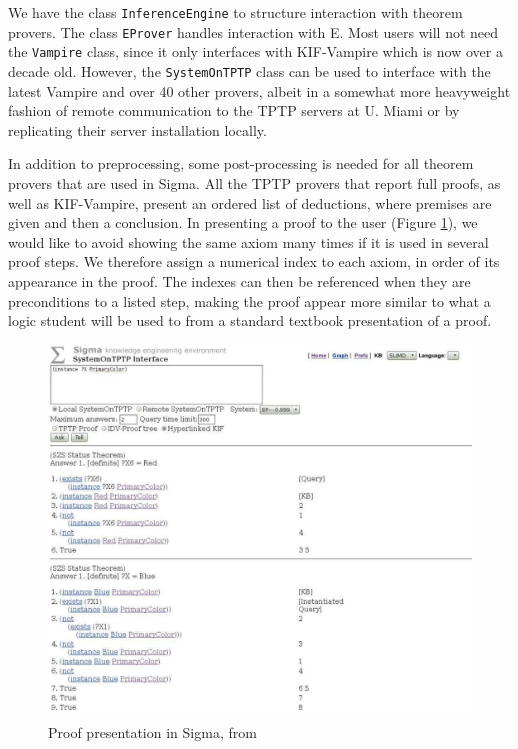 \documentclass{book}
\begin{document}
We have the class \texttt{InferenceEngine} to
structure interaction with theorem provers.  The class
\texttt{EProver} handles interaction with E.  Most users
will not need the \texttt{Vampire} class, since it only
interfaces with KIF-Vampire which is now over a decade old.  However, the
\texttt{SystemOnTPTP} class can be used to
interface with the latest Vampire and over 40 other provers, albeit in a
somewhat more heavyweight fashion of remote communication to the TPTP servers at
U. Miami or by replicating their server installation locally.

In addition to preprocessing, some post-processing is needed for all theorem
provers that are used in Sigma.  All the TPTP provers that report full proofs,
as well as KIF-Vampire, present an ordered list of deductions, where premises
are given and then a conclusion.  In presenting a proof to the user (Figure
\ref{fig:SigmaProof}), we would like to avoid showing the same axiom many times
if it is used in several proof steps.  We therefore assign a numerical index to
each axiom, in order of its appearance in the proof.  The indexes can then be
referenced when they are preconditions to a listed step, making the proof appear
more similar to what a logic student will be used to from a standard textbook
presentation of a proof.

\begin{figure}
  \centering
  \includegraphics[width=4.5in]{pictures/SigmaProof.jpg}
  \caption{Proof presentation in Sigma, from \cite{tsp08}}
  \label{fig:SigmaProof}
\end{figure}
\end{document}

